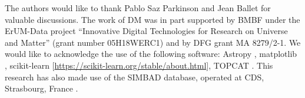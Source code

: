 The authors would like to thank Pablo Saz Parkinson and Jean Ballet for valuable discussions.
The work of DM was in part supported by BMBF under the ErUM-Data project ``Innovative Digital Technologies for Research on Universe and Matter'' (grant number 05H18WERC1) and by DFG grant MA 8279/2-1.
We would like to acknowledge the use of the following software:
Astropy \citep[\url{http://www.astropy.org},][]{2013A&A...558A..33A}, 
matplotlib \citep{Hunter:2007}, 
scikit-learn [\url{https://scikit-learn.org/stable/about.html}], 
TOPCAT \citep{2005ASPC..347...29T}.
This research has also made use of the SIMBAD database,
operated at CDS, Strasbourg, France \citep{2000A&AS..143....9W}.